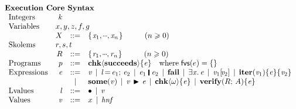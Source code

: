 






\begin{figure}[t]
  $$
\begin{array}{l}
\textbf{Execution Core Syntax} \\
  \begin{array}{lrcl@{}}
      \text{Integers} & k \\
      \text{Variables} & \multicolumn{3}{l}{x,y,z,f,g} \\
          & \ensuremath{X} & ::= & \ensuremath{\{\mskip1.5mu \Varid{x}_{\mathrm{1}},\mydots,\Varid{x}_{\Varid{n}}\mskip1.5mu\}}  \hspace{1cm} (n \geq 0)\\
      \text{Skolems} & \multicolumn{3}{l}{r,s,t} \\
          & \ensuremath{R} & ::= & \ensuremath{\{\mskip1.5mu \Varid{r}_{\mathrm{1}},\mydots,\Varid{r}_{\Varid{n}}\mskip1.5mu\}}  \hspace{1cm} (n \geq 0)\\
      \text{Programs} & p  & ::=  & \ensuremath{{\bf chk}\langle\textbf{succeeds}\rangle\{\Varid{e}\}} \quad \text{where} \; \freevars{e} = \{ \} \\
      \text{Expressions} & \ensuremath{\Varid{e}} & ::= & \ensuremath{\Varid{v}} \vb \ensuremath{\Varid{l}\hspace{-0.14em}=\hspace{-0.14em}\Varid{e}_{\mathrm{1}};\,\Varid{e}_{\mathrm{2}}} \vb \ensuremath{\Varid{e}_{\mathrm{1}}\;\rule[-0.1em]{0.15em}{0.75em}\;\Varid{e}_{\mathrm{2}}} \vb \ensuremath{\textbf{fail}}
                                     \vb \ensuremath{\exists\Varid{x}.\,\Varid{e}} \vb \ensuremath{\Varid{v}_{\mathrm{1}} [\!\Varid{v}_{\mathrm{2}}]} \vb \ensuremath{\textbf{iter}(\Varid{v}_{\mathrm{1}})\{\Varid{e}\}\{\Varid{v}_{\mathrm{2}}\}} \\
      && \vb & \ensuremath{{\bf some}(\Varid{v})} \vb \ensuremath{\Varid{v}\;\!\blacktriangleright{}\!\;\Varid{e}} \vb \ensuremath{{\bf chk}\langle\omega\rangle\{\Varid{e}\}}
      \vb \ensuremath{\textbf{verify}(R;\,A)\{\Varid{e}\}} \\
      \text{Lvalues} & \ensuremath{\Varid{l}} & ::= & \ensuremath{{\bullet}} \vb \ensuremath{\Varid{v}} \\
      \text{Values} & \ensuremath{\Varid{v}} & ::= & x  \vb \hnf \\

\end{array}
\end{array}$$
\end{figure}

